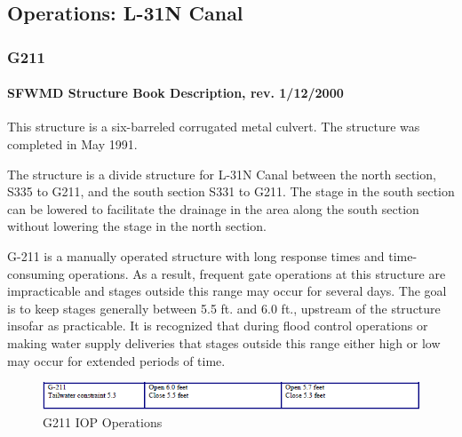 \clearpage

\subsection{Operations: L-31N Canal}

\subsubsection{G211}


\paragraph{SFWMD Structure Book Description, rev. 1/12/2000}
This structure is a six-barreled corrugated metal culvert. The structure was completed in May 1991.

The structure is a divide structure for L-31N Canal between the north section, S335 to G211, and the south section S331 to G211.
The stage in the south section can be lowered to facilitate the drainage in the area along the south section without lowering the stage in the north section.

G-211 is a manually operated structure with long response times and time-consuming operations.
As a result, frequent gate operations at this structure are impracticable and stages outside this range may occur for several days.
The goal is to keep stages generally between 5.5 ft. and 6.0 ft., upstream of the structure insofar as practicable.
It is recognized that during flood control operations or making water supply deliveries that stages outside this range either high or low may occur for extended periods of time.



\begin{figure}[!h]
  \begin{center}
  \includegraphics[width=6.5in]{../figs/G211_IOPops.png}
  \caption{G211 IOP Operations}
  \label{fig:G211iop}
  \end{center}
\end{figure}


